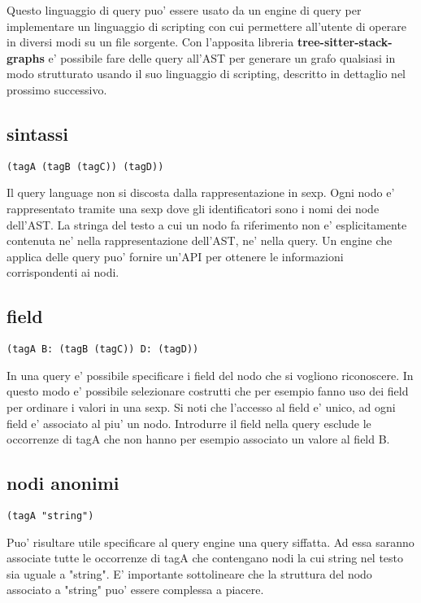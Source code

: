 Questo linguaggio di query puo' essere usato da un engine di query per implementare un linguaggio di scripting con cui permettere all'utente di operare in diversi modi su un file sorgente.
Con l'apposita libreria \textbf{tree-sitter-stack-graphs} e' possibile fare delle query all'AST per generare un grafo qualsiasi in modo strutturato usando il suo linguaggio di scripting, descritto in dettaglio nel prossimo successivo.

\subsection{sintassi}

\begin{lstlisting}
(tagA (tagB (tagC)) (tagD))
\end{lstlisting}

Il query language non si discosta dalla rappresentazione in sexp.
Ogni nodo e' rappresentato tramite una sexp dove gli identificatori sono i nomi dei node dell'AST.
La stringa del testo a cui un nodo fa riferimento non e' esplicitamente contenuta ne' nella rappresentazione dell'AST, ne' nella query.
Un engine che applica delle query puo' fornire un'API per ottenere le informazioni corrispondenti ai nodi.

\subsection{field}

\begin{lstlisting}
(tagA B: (tagB (tagC)) D: (tagD))
\end{lstlisting}

In una query e' possibile specificare i field del nodo che si vogliono riconoscere.
In questo modo e' possibile selezionare costrutti che per esempio fanno uso dei field per ordinare i valori in una sexp.
Si noti che l'accesso al field e' unico, ad ogni field e' associato al piu' un nodo.
Introdurre il field nella query esclude le occorrenze di tagA che non hanno per esempio associato un valore al field B.

\subsection{nodi anonimi}

\begin{lstlisting}
(tagA "string")
\end{lstlisting}

Puo' risultare utile specificare al query engine una query siffatta.
Ad essa saranno associate tutte le occorrenze di tagA che contengano nodi la cui string nel testo sia uguale a "string".
E' importante sottolineare che la struttura del nodo associato a "string" puo' essere complessa a piacere.

